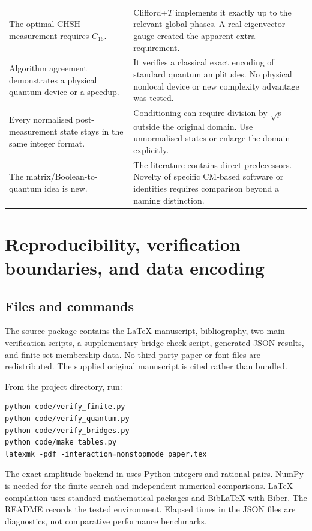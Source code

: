 \begin{longtable}{@{}L{0.31\textwidth}L{0.62\textwidth}@{}}
The optimal CHSH measurement requires $C_{16}$. & Clifford+$T$ implements it exactly up to the relevant global phases. A real eigenvector gauge created the apparent extra requirement.\\
Algorithm agreement demonstrates a physical quantum device or a speedup. & It verifies a classical exact encoding of standard quantum amplitudes. No physical nonlocal device or new complexity advantage was tested.\\
Every normalised post-measurement state stays in the same integer format. & Conditioning can require division by $\sqrt p$ outside the original domain. Use unnormalised states or enlarge the domain explicitly.\\
The matrix/Boolean-to-quantum idea is new. & The literature contains direct predecessors. Novelty of specific CM-based software or identities requires comparison beyond a naming distinction.\\
\bottomrule
\end{longtable}
\endgroup

\section{Reproducibility, verification boundaries, and data encoding}\label{app:repro}
\subsection{Files and commands}
The source package contains the LaTeX manuscript, bibliography, two main verification scripts, a supplementary bridge-check script, generated JSON results, and finite-set membership data. No third-party paper or font files are redistributed. The supplied original manuscript is cited rather than bundled.

From the project directory, run:
\begin{verbatim}
python code/verify_finite.py
python code/verify_quantum.py
python code/verify_bridges.py
python code/make_tables.py
latexmk -pdf -interaction=nonstopmode paper.tex
\end{verbatim}
The exact amplitude backend in  uses Python integers and rational pairs. NumPy is needed for the finite search and independent numerical comparisons. LaTeX compilation uses standard mathematical packages and BibLaTeX with Biber. The README records the tested environment. Elapsed times in the JSON files are diagnostics, not comparative performance benchmarks.

